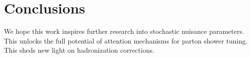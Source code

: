 \section{Conclusions}\label{sec:conclusions}

We hope this work inspires further research into stochastic nuisance
parameters. This unlocks the full potential of attention mechanisms for
parton shower tuning. This sheds new light on hadronization corrections.

